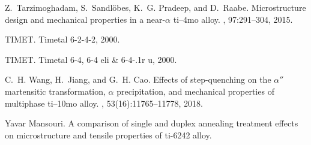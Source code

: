 \begin{thebibliography}{10}
Z.~Tarzimoghadam, S.~Sandl{\"o}bes, K.~G. Pradeep, and D.~Raabe.
\newblock Microstructure design and mechanical properties in a
  near-$\alpha$ ti--4mo alloy.
, 97:291--304, 2015.

TIMET.
\newblock Timetal 6-2-4-2, 2000.

TIMET.
\newblock Timetal 6-4, 6-4 eli {\&} 6-4-.1r u, 2000.

C.~H. Wang, H.~Jiang, and G.~H. Cao.
\newblock Effects of step-quenching on the $\alpha''$ martensitic
  transformation, $\alpha$ precipitation, and mechanical properties of
  multiphase ti--10mo alloy.
, 53(16):11765--11778, 2018.

{Yavar Mansouri}.
\newblock A comparison of single and duplex annealing treatment effects on
  microstructure and tensile properties of ti-6242 alloy.

\end{thebibliography}
